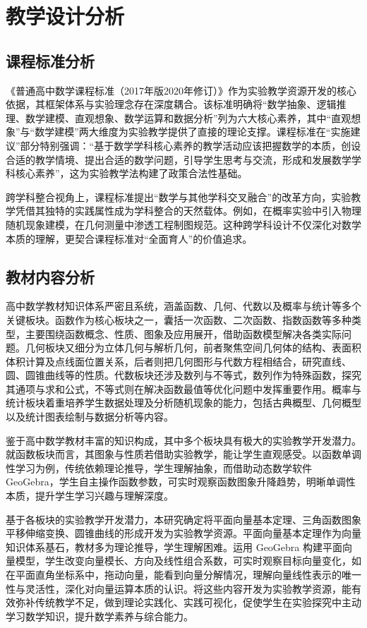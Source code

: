 \section{教学设计分析}
\subsection{课程标准分析}
《普通高中数学课程标准（2017年版2020年修订）》作为实验教学资源开发的核心依据，其框架体系与实验理念存在深度耦合。该标准明确将“数学抽象、逻辑推理、数学建模、直观想象、数学运算和数据分析”列为六大核心素养，其中“直观想象”与“数学建模”两大维度为实验教学提供了直接的理论支撑\cite{2018_史宁中_高中数学课程标准修订中的关键问题}。课程标准在“实施建议”部分特别强调：“基于数学学科核心素养的教学活动应该把握数学的本质，创设合适的教学情境、提出合适的数学问题，引导学生思考与交流，形成和发展数学学科核心素养”\cite{2020_中华人民共和国教育部_普通高中数学课程标准}，这为实验教学法构建了政策合法性基础。

跨学科整合视角上，课程标准提出“数学与其他学科交叉融合”的改革方向，实验教学凭借其独特的实践属性成为学科整合的天然载体。例如，在概率实验中引入物理随机现象建模，在几何测量中渗透工程制图规范。这种跨学科设计不仅深化对数学本质的理解，更契合课程标准对“全面育人”的价值追求。


\subsection{教材内容分析}

高中数学教材知识体系严密且系统，涵盖函数、几何、代数以及概率与统计等多个关键板块。函数作为核心板块之一，囊括一次函数、二次函数、指数函数等多种类型，主要围绕函数概念、性质、图象及应用展开，借助函数模型解决各类实际问题。几何板块又细分为立体几何与解析几何，前者聚焦空间几何体的结构、表面积体积计算及点线面位置关系，后者则把几何图形与代数方程相结合，研究直线、圆、圆锥曲线等的性质。代数板块还涉及数列与不等式，数列作为特殊函数，探究其通项与求和公式，不等式则在解决函数最值等优化问题中发挥重要作用。概率与统计板块着重培养学生数据处理及分析随机现象的能力，包括古典概型、几何概型以及统计图表绘制与数据分析等内容。​

鉴于高中数学教材丰富的知识构成，其中多个板块具有极大的实验教学开发潜力。就函数板块而言，其图象与性质若借助实验教学，能让学生直观感受。以函数单调性学习为例，传统依赖理论推导，学生理解抽象，而借助动态数学软件 GeoGebra，学生自主操作函数参数，可实时观察函数图象升降趋势，明晰单调性本质，提升学生学习兴趣与理解深度。​​

基于各板块的实验教学开发潜力，本研究确定将平面向量基本定理、三角函数图象平移伸缩变换、圆锥曲线的形成开发为实验教学资源。平面向量基本定理作为向量知识体系基石，教材多为理论推导，学生理解困难。运用 GeoGebra 构建平面向量模型，学生改变向量模长、方向及线性组合系数，可实时观察目标向量变化，如在平面直角坐标系中，拖动向量，能看到向量分解情况，理解向量线性表示的唯一性与灵活性，深化对向量运算本质的认识。将这些内容开发为实验教学资源，能有效弥补传统教学不足，做到理论实践化、实践可视化，促使学生在实验探究中主动学习数学知识，提升数学素养与综合能力。